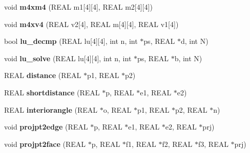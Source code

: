\begin{DoxyCompactItemize}
void {\bfseries m4xm4} (R\+E\+AL m1\mbox{[}4\mbox{]}\mbox{[}4\mbox{]}, R\+E\+AL m2\mbox{[}4\mbox{]}\mbox{[}4\mbox{]})
\item 
\mbox{\label{classStemMesh3D_1_1tetgenmesh_a233f02e22a2980707eb757537f6b2603}} 
void {\bfseries m4xv4} (R\+E\+AL v2\mbox{[}4\mbox{]}, R\+E\+AL m\mbox{[}4\mbox{]}\mbox{[}4\mbox{]}, R\+E\+AL v1\mbox{[}4\mbox{]})
\item 
\mbox{\label{classStemMesh3D_1_1tetgenmesh_a858a62a27c000670ba39901dd3700f5c}} 
bool {\bfseries lu\+\_\+decmp} (R\+E\+AL lu\mbox{[}4\mbox{]}\mbox{[}4\mbox{]}, int n, int $\ast$ps, R\+E\+AL $\ast$d, int N)
\item 
\mbox{\label{classStemMesh3D_1_1tetgenmesh_ab7860349f340f914382ff04e544be3e7}} 
void {\bfseries lu\+\_\+solve} (R\+E\+AL lu\mbox{[}4\mbox{]}\mbox{[}4\mbox{]}, int n, int $\ast$ps, R\+E\+AL $\ast$b, int N)
\item 
\mbox{\label{classStemMesh3D_1_1tetgenmesh_af533e75e97a0de02e295e516ec2ebb4a}} 
R\+E\+AL {\bfseries distance} (R\+E\+AL $\ast$p1, R\+E\+AL $\ast$p2)
\item 
\mbox{\label{classStemMesh3D_1_1tetgenmesh_a8dce50f948d1ecde2fbe4d2163238ed5}} 
R\+E\+AL {\bfseries shortdistance} (R\+E\+AL $\ast$p, R\+E\+AL $\ast$e1, R\+E\+AL $\ast$e2)
\item 
\mbox{\label{classStemMesh3D_1_1tetgenmesh_a5f108c7f319c164470205ee6b1b9d146}} 
R\+E\+AL {\bfseries interiorangle} (R\+E\+AL $\ast$o, R\+E\+AL $\ast$p1, R\+E\+AL $\ast$p2, R\+E\+AL $\ast$n)
\item 
\mbox{\label{classStemMesh3D_1_1tetgenmesh_adbecd56edd7358a802eeeff35c1a8dc6}} 
void {\bfseries projpt2edge} (R\+E\+AL $\ast$p, R\+E\+AL $\ast$e1, R\+E\+AL $\ast$e2, R\+E\+AL $\ast$prj)
\item 
\mbox{\label{classStemMesh3D_1_1tetgenmesh_af5bab2ae7651ef19cffb6fb1c497ddc5}} 
void {\bfseries projpt2face} (R\+E\+AL $\ast$p, R\+E\+AL $\ast$f1, R\+E\+AL $\ast$f2, R\+E\+AL $\ast$f3, R\+E\+AL $\ast$prj)

\end{DoxyCompactItemize}
